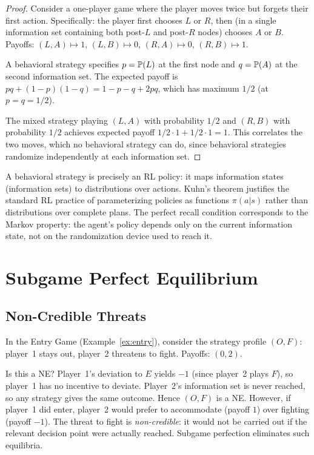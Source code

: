 \documentclass[11pt,a4paper]{article}
\begin{document}
\begin{proof}
Consider a one-player game where the player moves twice but forgets their
first action. Specifically: the player first chooses $L$ or $R$, then (in
a single information set containing both post-$L$ and post-$R$ nodes)
chooses $A$ or $B$. Payoffs: $(L,A) \mapsto 1$, $(L,B) \mapsto 0$,
$(R,A) \mapsto 0$, $(R,B) \mapsto 1$.

A behavioral strategy specifies $p = \mathbb{P}(L)$ at the first node and
$q = \mathbb{P}(A)$ at the second information set. The expected payoff is
$pq + (1-p)(1-q) = 1 - p - q + 2pq$, which has maximum $1/2$ (at
$p = q = 1/2$).

The mixed strategy playing $(L,A)$ with probability $1/2$ and $(R,B)$ with
probability $1/2$ achieves expected payoff $1/2 \cdot 1 + 1/2 \cdot 1 = 1$.
This correlates the two moves, which no behavioral strategy can do, since
behavioral strategies randomize independently at each information set.
\end{proof}

\begin{rlconnection}
A behavioral strategy is precisely an RL policy: it maps information states
(information sets) to distributions over actions. Kuhn's theorem justifies
the standard RL practice of parameterizing policies as functions
$\pi(a|s)$ rather than distributions over complete plans. The perfect recall
condition corresponds to the Markov property: the agent's policy depends
only on the current information state, not on the randomization device
used to reach it.
\end{rlconnection}


\section{Subgame Perfect Equilibrium}
\label{sec:spe}

\subsection{Non-Credible Threats}
\label{subsec:noncredible}

\begin{example}
\label{ex:noncredible}
In the Entry Game (Example~\ref{ex:entry}), consider the strategy profile
$(O, F)$: player~1 stays out, player~2 threatens to fight. Payoffs: $(0,2)$.

Is this a NE? Player~1's deviation to $E$ yields $-1$ (since player~2
plays $F$), so player~1 has no incentive to deviate. Player~2's information
set is never reached, so any strategy gives the same outcome. Hence $(O,F)$
is a NE. However, if player~1 did enter, player~2 would prefer to
accommodate (payoff $1$) over fighting (payoff $-1$). The threat to fight
is \emph{non-credible}: it would not be carried out if the relevant decision
point were actually reached. Subgame perfection eliminates such equilibria.
\end{example}
\end{document}
